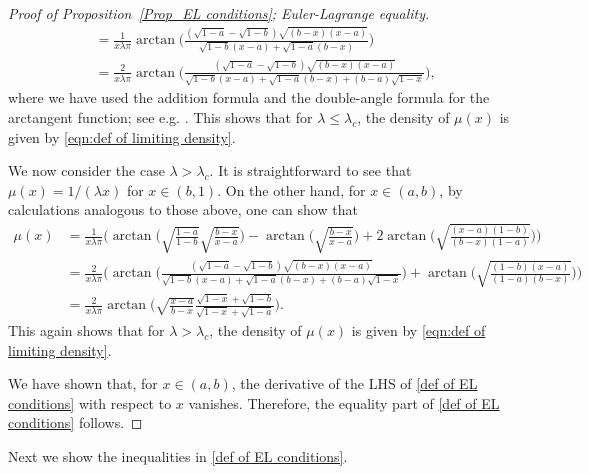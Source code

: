 \documentclass{amsart}
\theoremstyle{plain}
\theoremstyle{remark}
\numberwithin{equation}{section}
\begin{document}
\begin{proof}[Proof of Proposition~\ref{Prop_EL conditions}; Euler-Lagrange equality]
\begin{align*}
       & =\frac{1}{x\lambda\pi}\arctan\bigg(\frac{(\sqrt{1-a}-\sqrt{1-b})\sqrt{(b-x)(x-a)}}{\sqrt{1-b}(x-a) + \sqrt{1-a}(b-x)}\bigg)
       \\
       & =\frac{2}{x\lambda\pi} \arctan \bigg( \frac{(\sqrt{1-a}-\sqrt{1-b})\sqrt{(b-x)(x-a)}}{\sqrt{1-b}(x-a) + \sqrt{1-a}(b-x) + (b-a)\sqrt{1-x}} \bigg), 
\end{align*} 
where we have used the addition formula and the double-angle formula
for the arctangent function; see e.g. \cite[Eq.~(4.24.15)]{NIST}. This shows that for $\lambda \le \lambda_c$, the density of $\mu(x)$ is given by \eqref{eqn:def of limiting density}. 
 
We now consider the case $\lambda > \lambda_c$.
It is straightforward to see that $\mu(x) = 1/(\lambda x)$ for $x \in (b,1)$.
On the other hand, for $x \in (a,b)$, by calculations analogous to those above, one can show that
\begin{align*}
 \mu(x) &= \frac{1}{x\lambda\pi}\bigg(\arctan\bigg(\sqrt{\frac{1-a}{1-b}}\sqrt{\frac{b-x}{x-a}}\bigg) - \arctan\bigg(\sqrt{\frac{b-x}{x-a}}\bigg)+2\arctan\bigg(\sqrt{\frac{(x-a)(1-b)}{(b-x)(1-a)}}\bigg)\bigg)  
       \\ 
       & = \frac{2}{x\lambda\pi} \bigg( \arctan \bigg( \frac{(\sqrt{1-a}-\sqrt{1-b})\sqrt{(b-x)(x-a)}}{\sqrt{1-b}(x-a) + \sqrt{1-a}(b-x) + (b-a)\sqrt{1-x}} \bigg) + \arctan\bigg( \sqrt{\frac{(1-b)(x-a)}{(1-a)(b-x)}}\bigg) \bigg)  
       \\
       &=  \frac{2}{x\lambda\pi}  \arctan \bigg(  \sqrt{ \frac{x-a }{b-x} } \frac{\sqrt{1-x}+\sqrt{1-b} }{ \sqrt{1-x}+\sqrt{1-a} }  \bigg) . 
\end{align*} 
This again shows that for $\lambda >  \lambda_c$, the density of $\mu(x)$ is given by \eqref{eqn:def of limiting density}. 

We have shown that, for $x \in (a,b)$, the derivative of the LHS of \eqref{def of EL conditions} with respect to $x$ vanishes. Therefore, the equality part of \eqref{def of EL conditions} follows.
\end{proof} 





Next we show the inequalities in \eqref{def of EL conditions}. 
\end{document}
